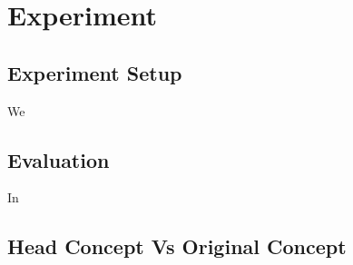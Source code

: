 \section{Experiment}

\subsection{Experiment Setup}

We

\subsection{Evaluation}
In


\subsection{Head Concept Vs Original Concept}





